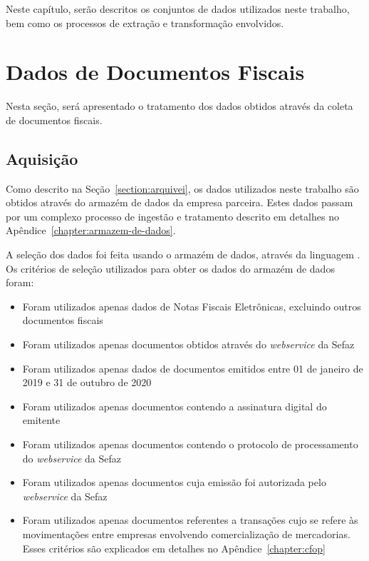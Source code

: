 
Neste capítulo, serão descritos os conjuntos de dados utilizados neste trabalho, bem como os processos de extração e transformação envolvidos.

\section{Dados de Documentos Fiscais}
\label{section:dados-de-documentos-fiscais}

Nesta seção, será apresentado o tratamento dos dados obtidos através da coleta de documentos fiscais.

\subsection{Aquisição}

Como descrito na Seção~\ref{section:arquivei}, os dados utilizados neste trabalho são obtidos através do armazém de dados da empresa parceira. Estes dados passam por um complexo processo de ingestão e tratamento descrito em detalhes no Apêndice~\ref{chapter:armazem-de-dados}.

A seleção dos dados foi feita usando o armazém de dados, através da linguagem . Os critérios de seleção utilizados para obter os dados do armazém de dados foram:

\begin{itemize}
    \item Foram utilizados apenas dados de Notas Fiscais Eletrônicas, excluindo outros documentos fiscais
    \item Foram utilizados apenas documentos obtidos através do \textit{webservice} da Sefaz
    \item Foram utilizados apenas dados de documentos emitidos entre 01 de janeiro de 2019 e 31 de outubro de 2020
    \item Foram utilizados apenas documentos contendo a assinatura digital do emitente
    \item Foram utilizados apenas documentos contendo o protocolo de processamento do \textit{webservice} da Sefaz
    \item Foram utilizados apenas documentos cuja emissão foi autorizada pelo \textit{webservice} da Sefaz
    \item Foram utilizados apenas documentos referentes a transações cujo  se refere às movimentações entre empresas envolvendo comercialização de mercadorias. Esses critérios são explicados em detalhes no Apêndice~\ref{chapter:cfop}
\end{itemize}

